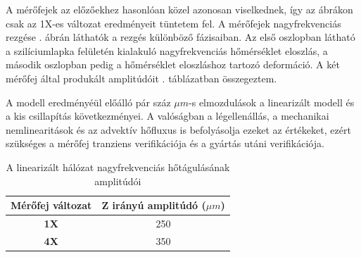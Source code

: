 A mérőfejek az előzőekhez hasonlóan közel azonosan viselkednek, így az ábrákon csak az 1X-es változat eredményeit tüntetem fel. A mérőfejek nagyfrekvenciás rezgése . ábrán láthatók a rezgés különböző fázisaiban. Az első oszlopban látható a szilíciumlapka felületén kialakuló nagyfrekvenciás hőmérséklet eloszlás, a második oszlopban pedig a hőmérséklet eloszláshoz tartozó deformáció. A két mérőfej által produkált amplitúdóit . táblázatban összegeztem.

A modell eredményéül előálló pár száz $\mu m$-s elmozdulások a linearizált modell és a kis csillapítás következményei. A valóságban a légellenállás, a mechanikai nemlinearitások és az advektív hőfluxus is befolyásolja ezeket az értékeket, ezért szükséges a mérőfej tranziens verifikációja és a gyártás utáni verifikációja.

\begin{table}[!ht]
    \centering
    \begin{tabular}{@{}cc@{}}
        \toprule
        \textbf{Mérőfej változat} & \textbf{Z irányú amplitúdó ($\mu m$)} \\
        \hline
        \textbf{1X} & 250 \\
        \textbf{4X} & 350 \\
        \bottomrule
    \end{tabular}
    \caption{A linearizált hálózat nagyfrekvenciás hőtágulásának amplitúdói}
    \label{tab:AC_amplitudes}
\end{table}


